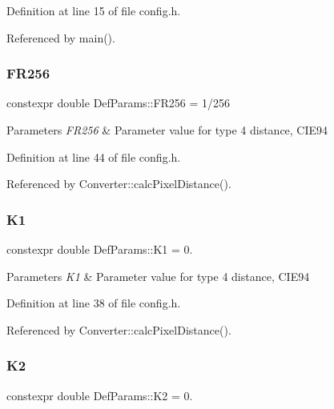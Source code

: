 Definition at line 15 of file config.\+h.



Referenced by main().

\mbox{\label{namespace_def_params_ace7abc998b941cb3abdff5202b95b54d}} 
\subsubsection{\texorpdfstring{FR256}{FR256}}
{\footnotesize\ttfamily constexpr double Def\+Params\+::\+F\+R256 = 1/256}


\begin{DoxyParams}{Parameters}
{\em F\+R256} & Parameter value for type 4 distance, C\+I\+E94 \\
\hline
\end{DoxyParams}


Definition at line 44 of file config.\+h.



Referenced by Converter\+::calc\+Pixel\+Distance().

\mbox{\label{namespace_def_params_ade015d45cc93072e45d278d5e5be7ebb}} 
\subsubsection{\texorpdfstring{K1}{K1}}
{\footnotesize\ttfamily constexpr double Def\+Params\+::\+K1 = 0.}


\begin{DoxyParams}{Parameters}
{\em K1} & Parameter value for type 4 distance, C\+I\+E94 \\
\hline
\end{DoxyParams}


Definition at line 38 of file config.\+h.



Referenced by Converter\+::calc\+Pixel\+Distance().

\mbox{\label{namespace_def_params_af4d7a411a81848498791ad3cf73ff4eb}} 
\subsubsection{\texorpdfstring{K2}{K2}}
{\footnotesize\ttfamily constexpr double Def\+Params\+::\+K2 = 0.}


